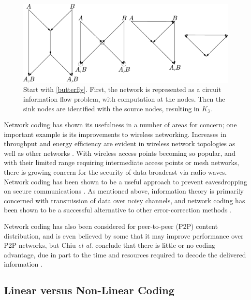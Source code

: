 \begin{figure}[ht]
	\centering
	\includegraphics[width=350pt]{figures/butterfly_to_k3.pdf}
	\caption[Converting the butterfly network to a graph]{Start with \autoref{butterfly}. First, the network is represented as a circuit information flow problem, with computation at the nodes. Then the sink nodes are identified with the source nodes, resulting in $K_3$.}
	\label{butterfly_to_k3}
\end{figure}

Network coding has shown its usefulness in a number of areas for concern; one important example is its improvements to wireless networking. Increases in throughput and energy efficiency are evident in wireless network topologies as well as other networks \cite{sagd2005}. With wireless access points becoming so popular, and with their limited range requiring intermediate access points or mesh networks, there is growing concern for the security of data broadcast via radio waves. Network coding has been shown to be a useful approach to prevent eavesdropping on secure communications \cite{caiy2002}. As mentioned above, information theory is primarily concerned with transmission of data over noisy channels, and network coding has been shown to be a successful alternative to other error-correction methods \cite{lars2006}.

Network coding has also been considered for peer-to-peer (P2P) content distribution, and is even believed by some that it may improve performance over P2P networks, but Chiu \textit{et al.} conclude that there is little or no coding advantage, due in part to the time and resources required to decode the delivered information \cite{chiu2006}.

\subsection{Linear versus Non-Linear Coding}
\label{sect:lin_v_nonlin}

